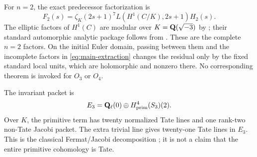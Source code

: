 For \(n=2\), the exact predecessor factorization is
\begin{equation}\label{eq:n2-factor}
 F_2(s)=\zeta_K(2s+1)^7
 L(H^1(C/K),2s+1)H_2(s).
\end{equation}
The elliptic factors of \(H^1(C)\) are modular over
\(K=\mathbf Q(\sqrt{-3})\) by \cite[Theorem 1.1]{CaraianiNewton2025};
their standard automorphic analytic package follows from
\cite[Global Theory, pp.~136--184]{GodementJacquet1972}.
These are the complete \(n=2\) factors.  On the initial Euler domain,
passing between them and the incomplete factors in
\eqref{eq:main-extraction} changes the residual only by the fixed standard
local units, which are holomorphic and nonzero there.  No corresponding
theorem is invoked for \(O_3\) or \(O_4\).

\begin{remark}[Fermat refinement at \(n=3\)]
The invariant packet is
\[
 E_3=\mathbf Q_\ell(0)\oplus H^4_{\mathrm{prim}}(S_3)(2).
\]
Over \(K\), the primitive term has twenty normalized Tate lines and one
rank-two non-Tate Jacobi packet.  The extra trivial line gives twenty-one
Tate lines in \(E_3\).  This is the classical Fermat/Jacobi decomposition
\cite{Weil1952,Brunjes2003}; it is not a claim that the entire primitive
cohomology is Tate.
\end{remark}
